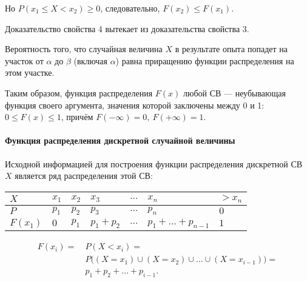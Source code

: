 \documentclass[a4paper]{article}
\makeatletter
\newcommand{\sleq}{\leqslant}
\newcommand{\sgeq}{\geqslant}
\renewcommand{\qedsymbol}{\ensuremath{\blacksquare}}
\newcommand{\qeddnostar}{\hfill{\color{Dark}\qedsymbol}}
\newcommand{\qeddstar}[1]{\hfill{\color{Dark}\raisebox{#1}{\qedsymbol}}}
\newcommand\qedd{\@ifstar\qeddstar\qeddnostar}
\makeatother
\begin{document}
                    Но $P(x_1 \sleq X < x_2) \sgeq 0$, следовательно, $F(x_2) \sleq F(x_1)$. \qedd

                    Доказательство свойства 4 вытекает из доказательства свойства 3.

                    Вероятность того, что случайная величина $X$ в результате опыта попадет на участок от $\alpha$ до $\beta$ (включая $\alpha$) равна приращению функции распределения на этом участке.
                    
                    Таким образом, функция распределения $F(x)$ любой СВ --- неубывающая функция своего аргумента, значения которой заключены между 0 и 1: \newline
                    $0 \sleq F(x) \sleq 1$, причём $F(-\infty) = 0 , \: F(+\infty) = 1$.

                \paragraph{Функция распределения дискретной случайной величины}

                    Исходной информацией для построения функции распределения дискретной СВ $X$ является ряд распределения этой СВ:

                    \begin{tabular}{*{5}{|C{1.6cm}}|C{2.8cm}|C{1.8cm}|}
                        \hline
                        $X$ & $x_1$ & $x_2$ & $x_3$ & $\ldots$ & $x_n$ & $> x_n$ \\
                        \hline
                        $P$ & $p_1$ & $p_2$ & $p_3$ & $\ldots$ & $p_n$ & $0$ \\
                        \hline
                        $F(x_1)$ & $0$ & $p_1$ & $p_1 + p_2$ & $\ldots$ &
                            $p_1 + \ldots + p_{n - 1}$ & $1$ \\
                        \hline
                    \end{tabular}
                    \begin{equation*}
                        \begin{aligned}
                            F(x_i) = ~& P(X < x_i) = \\[1.0ex]
                            & P \big( (X = x_1) \cup (X = x_2) \cup \ldots \cup
                                (X = x_{i - 1}) \big) = \\[1.0ex]
                            & p_1 + p_2 + \ldots + p_{i - 1} .
                        \end{aligned}
                    \end{equation*}
\end{document}
